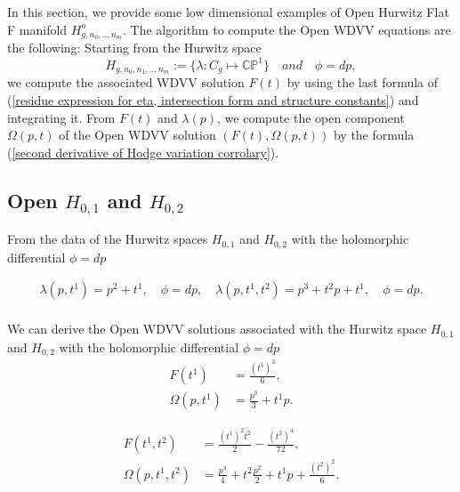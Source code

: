 \documentclass{article}
\theoremstyle{definition}
\begin{document}
In this section, we provide some low dimensional examples of Open Hurwitz Flat F manifold $H_{g,n_0,..,n_m}^o$. The algorithm to compute the Open WDVV equations are the following: Starting from  the Hurwitz space 
\begin{equation*}
H_{g,n_0,n_1,..,n_m}:=\{ \lambda: C_g\mapsto \mathbb{CP}^1\}\quad  and \quad \phi=dp,
\end{equation*}
 we compute the associated WDVV solution $F(t)$ by using the last  formula of (\ref{residue expression for eta, intersection form and structure constants}) and integrating it. From $F(t)$ and $\lambda(p)$, we compute the open component $\Omega(p,t)$ of the Open WDVV solution  $(F(t),\Omega(p,t))$ by the formula (\ref{second derivative of Hodge variation corrolary}).\\

\subsection{Open  $H_{0,1}$ and $H_{0,2}$}

From the data of the Hurwitz spaces $H_{0,1}$  and $H_{0,2}$ with the holomorphic differential $\phi=dp$ 

\begin{equation*}
\begin{split}
\lambda(p,t^1)=p^2+t^1,\quad \phi=dp,\quad \lambda(p,t^1,t^2)=p^3+t^2p+t^1,\quad \phi=dp.\\
\end{split}
\end{equation*}

We can derive the  Open WDVV solutions associated with the Hurwitz space  $H_{0,1}$  and $H_{0,2}$ with the holomorphic differential $\phi=dp$
\begin{equation}\label{open WDVVlg h01}
\begin{split}
F(t^1)&=\frac{(t^1)^3}{6},\\
\Omega(p,t^1)&=\frac{p^3}{3}+t^1p.
\end{split}
\end{equation}

\begin{equation}\label{Open WDVVlg h02}
\begin{split}
F(t^1,t^2)&=\frac{(t^1)^2t^2}{2}-\frac{(t^2)^4}{72},\\
\Omega(p,t^1,t^2)&=\frac{p^4}{4}+t^2\frac{p^2}{2}+t^1p+\frac{(t^2)^2}{6}.
\end{split}
\end{equation}
\end{document}
